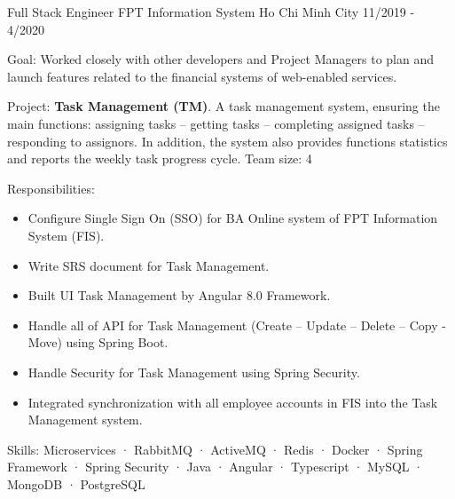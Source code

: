 \cventry
    {Full Stack Engineer} %
    {FPT Information System} %
    {Ho Chi Minh City} %
    {11/2019 - 4/2020} %
    {
      \begin{cvitems} %
        \item {Goal: Worked closely with other developers and Project Managers to plan and launch features related to the financial systems of web-enabled services.}
        \item {Project: \textbf{Task Management (TM)}. A task management system, ensuring the main functions: assigning tasks – getting tasks – completing assigned tasks – responding to assignors. In addition, the system also provides functions statistics and reports the weekly task progress cycle. Team size: 4}
        \item {Responsibilities: }
        {
            \begin{itemize} %
                \item {Configure Single Sign On (SSO) for BA Online system of FPT Information System (FIS).}
                \item {Write SRS document for Task Management.}
                \item {Built UI Task Management by Angular 8.0 Framework.}
                \item {Handle all of API for Task Management (Create – Update – Delete – Copy - Move) using Spring Boot.}
                \item {Handle Security for Task Management using Spring Security.}
                \item {Integrated synchronization with all employee accounts in FIS into the Task Management system.}
            \end{itemize}
        }
        \item {Skills: Microservices · RabbitMQ · ActiveMQ · Redis · Docker · Spring Framework · Spring Security · Java · Angular · Typescript · MySQL · MongoDB · PostgreSQL}
      \end{cvitems}
    }
